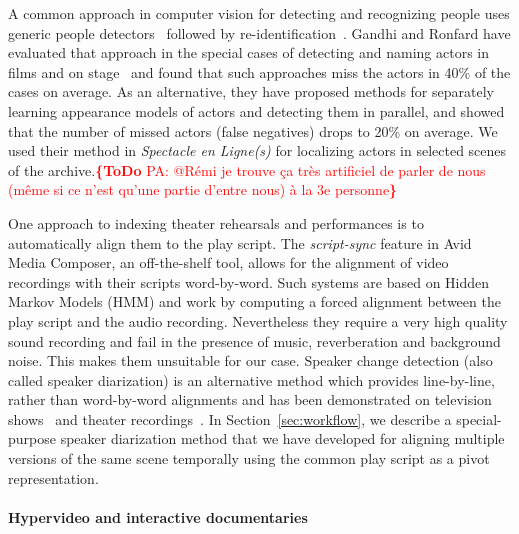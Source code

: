\documentclass[conference]{IEEEtran}
\newcommand{\todo}[1]{\noindent\textcolor{red}{{\bf \{ToDo} #1{\bf \}}}}
\begin{document}
A common approach in computer vision for detecting and recognizing people uses generic people detectors~\cite{Ronfard02,
Dalal05,Felzenszwalb10,Andriluka12} followed by re-identification~\cite{TapaswiBS12}. Gandhi and Ronfard have evaluated 
that approach in the special cases of detecting and naming actors in films and on stage~\cite{Gandhi13} and found that such 
approaches miss the actors in 40\% of the cases on average. As an alternative, they have proposed
methods for separately learning appearance models of actors and detecting them in parallel, and showed that the number
of missed actors (false negatives) drops to 20\% on average. We used their method in \emph{Spectacle en Ligne(s)} for localizing
actors in selected scenes of the archive.\todo{PA: @Rémi je trouve ça très artificiel de parler de nous (même si ce n'est qu'une partie d'entre nous) à la 3e personne}

One approach to indexing theater rehearsals and performances is to automatically align
them to the play script. The {\em script-sync} feature in Avid Media Composer,
an off-the-shelf tool, allows for the alignment of video recordings with their scripts word-by-word. Such systems
are based on Hidden Markov Models (HMM) and work by computing  a forced alignment 
between the play script and the audio recording. Nevertheless they require a very high quality 
sound recording and fail in the presence of music, reverberation and background noise. This makes them
unsuitable for our case. Speaker change detection (also called speaker diarization) is an alternative method
which provides line-by-line, rather than word-by-word alignments and has been demonstrated 
on television shows~\cite{Sankar09} and theater recordings~\cite{Caillet07,Caillet13}. In Section~\ref{sec:workflow},
we describe a special-purpose speaker diarization method that we have developed for aligning multiple versions 
of the same scene temporally using the common play script as a pivot representation.


\paragraph*{Hypervideo and interactive documentaries}
\end{document}

